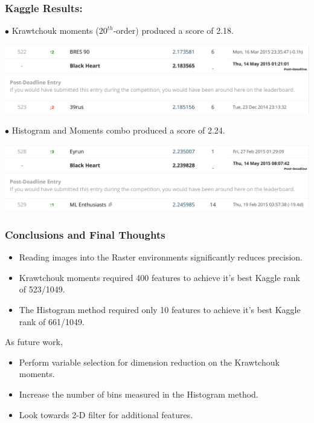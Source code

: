 \documentclass{beamer}
\begin{document}

\begin{frame}
	\frametitle{Kaggle Results:}
$\bullet$ Krawtchouk moments ($20^{th}$-order) produced a score of 2.18. \\
\begin{center}
	\includegraphics[scale=0.2]{Telly.png}
\end{center}
$\bullet$ Histogram and Moments combo produced a score of 2.24. \\
\begin{center}
	\includegraphics[scale=0.23]{Kolchak.png}
\end{center}
\end{frame}


\begin{frame}
	\frametitle{Conclusions and Final Thoughts}
	\begin{itemize}
		\item Reading images into the Raster environments significantly reduces precision.
		\item Krawtchouk moments required 400 features to achieve it's best Kaggle rank of 523/1049.
		\item The Histogram method required only 10 features to achieve it's best Kaggle rank of 661/1049.
	\end{itemize}
As future work, 
	\begin{itemize}
		\item Perform variable selection for dimension reduction on the Krawtchouk moments.
		\item Increase the number of bins measured in the Histogram method.
		\item Look towards 2-D filter for additional features.
	\end{itemize}
\end{frame}
\end{document}

